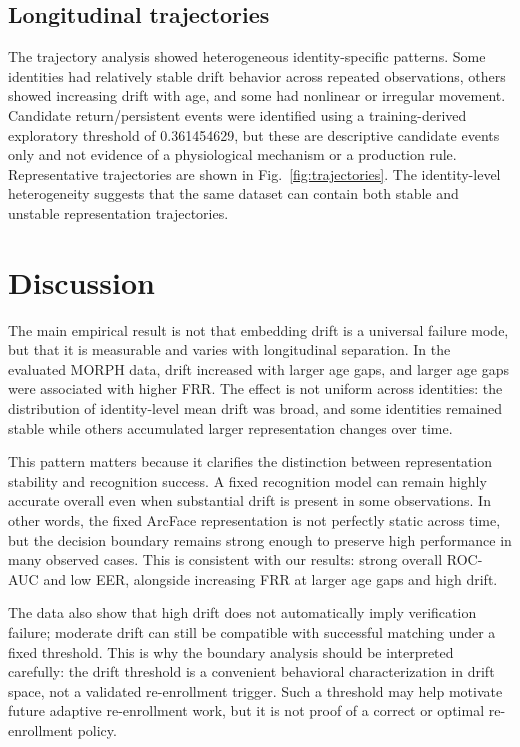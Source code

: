 \documentclass[conference]{IEEEtran}
\begin{document}
\subsection{Longitudinal trajectories}
The trajectory analysis showed heterogeneous identity-specific patterns. Some identities had relatively stable drift behavior across repeated observations, others showed increasing drift with age, and some had nonlinear or irregular movement. Candidate return/persistent events were identified using a training-derived exploratory threshold of 0.361454629, but these are descriptive candidate events only and not evidence of a physiological mechanism or a production rule. Representative trajectories are shown in Fig.~\ref{fig:trajectories}. The identity-level heterogeneity suggests that the same dataset can contain both stable and unstable representation trajectories.

\section{Discussion}
\label{sec:discussion}
The main empirical result is not that embedding drift is a universal failure mode, but that it is measurable and varies with longitudinal separation. In the evaluated MORPH data, drift increased with larger age gaps, and larger age gaps were associated with higher FRR. The effect is not uniform across identities: the distribution of identity-level mean drift was broad, and some identities remained stable while others accumulated larger representation changes over time.

This pattern matters because it clarifies the distinction between representation stability and recognition success. A fixed recognition model can remain highly accurate overall even when substantial drift is present in some observations. In other words, the fixed ArcFace representation is not perfectly static across time, but the decision boundary remains strong enough to preserve high performance in many observed cases. This is consistent with our results: strong overall ROC-AUC and low EER, alongside increasing FRR at larger age gaps and high drift.

The data also show that high drift does not automatically imply verification failure; moderate drift can still be compatible with successful matching under a fixed threshold. This is why the boundary analysis should be interpreted carefully: the drift threshold is a convenient behavioral characterization in drift space, not a validated re-enrollment trigger. Such a threshold may help motivate future adaptive re-enrollment work, but it is not proof of a correct or optimal re-enrollment policy.
\end{document}
